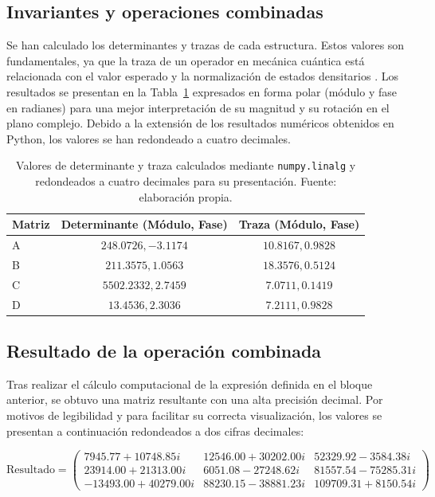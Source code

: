 \documentclass[11pt,a4paper,spanish]{book}
\begin{document}
\subsection{Invariantes y operaciones combinadas}
Se han calculado los determinantes y trazas de cada estructura. Estos valores son fundamentales, ya que la traza de un operador en mecánica cuántica está relacionada con el valor esperado y la normalización de estados densitarios \citep{nielsen2010}. Los resultados se presentan en la Tabla~\ref{tab:invariantes} expresados en forma polar (módulo y fase en radianes) para una mejor interpretación de su magnitud y su rotación en el plano complejo. Debido a la extensión de los resultados numéricos obtenidos en Python, los valores se han redondeado a cuatro decimales.

\begin{table}[ht]
    \centering
    \begin{tabular}{l c c}
        \hline\hline
        Matriz & Determinante (Módulo, Fase) & Traza (Módulo, Fase) \\ [0.5ex] 
        \hline 
        A  & $248.0726, -3.1174$ & $10.8167, 0.9828$ \\
        B  & $211.3575, 1.0563$ & $18.3576, 0.5124$ \\
        C  & $5502.2332, 2.7459$ & $7.0711, 0.1419$ \\
        D  & $13.4536, 2.3036$ & $7.2111, 0.9828$ \\
        \hline
    \end{tabular}
    \caption[Resultados de invariantes matriciales]{Valores de determinante y traza calculados mediante \texttt{numpy.linalg} y redondeados a cuatro decimales para su presentación. Fuente: elaboración propia.}
    \label{tab:invariantes}
\end{table}

\subsection{Resultado de la operación combinada}
Tras realizar el cálculo computacional de la expresión definida en el bloque anterior, se obtuvo una matriz resultante con una alta precisión decimal. Por motivos de legibilidad y para facilitar su correcta visualización, los valores se presentan a continuación redondeados a dos cifras decimales:

\begin{equation}
\text{Resultado} = \begin{pmatrix}
7945.77 + 10748.85i & 12546.00 + 30202.00i & 52329.92 - 3584.38i \\
23914.00 + 21313.00i & 6051.08 - 27248.62i & 81557.54 - 75285.31i \\
-13493.00 + 40279.00i & 88230.15 - 38881.23i & 109709.31 + 8150.54i
\end{pmatrix}
\end{equation}
\end{document}
